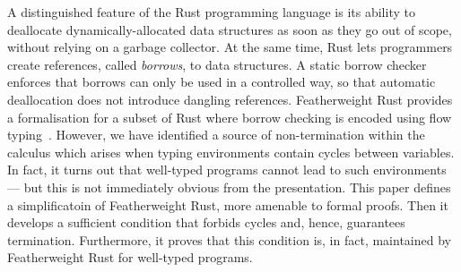 A distinguished feature of the Rust programming language is its
ability to deallocate dynamically-allocated data structures as soon as
they go out of scope, without relying on a garbage collector. At the
same time, Rust lets programmers create references, called
\emph{borrows}, to data structures. A static borrow checker enforces
that borrows can only be used in a controlled way, so that automatic
deallocation does not introduce dangling references.  Featherweight
Rust provides a formalisation for a subset of Rust where borrow
checking is encoded using flow typing~\cite{Pearce21}.  However, we
have identified a source of non-termination within the calculus which
arises when typing environments contain cycles between variables.  In
fact, it turns out that well-typed programs cannot lead to such
environments --- but this is not immediately obvious from the
presentation.  This paper defines a simplificatoin of Featherweight Rust,
more amenable to formal proofs. Then it develops
a sufficient condition that forbids
cycles and, hence, guarantees termination.  Furthermore, it proves that this
condition is, in fact, maintained by Featherweight Rust for well-typed
programs.
